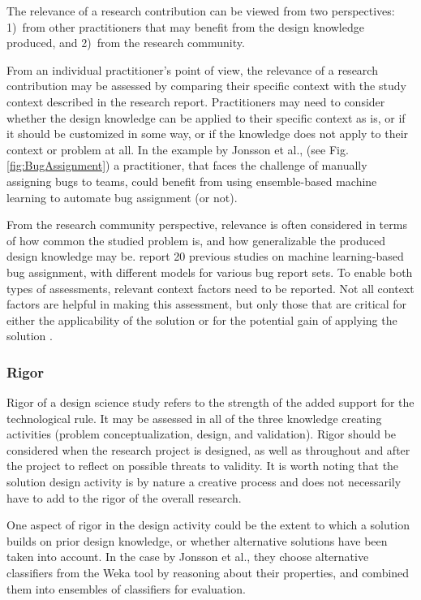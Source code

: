 \documentclass[graybox]{svmult}
\newcommand{\peggy}[1]{\textcolor{blue}{{\it [Peggy says: #1]}}}
\newcommand{\peggy}[1]{}
\begin{document}
The relevance of a research contribution can be viewed from two perspectives: 1)~from other practitioners that may benefit from the design knowledge produced, and 2)~from the research community. 

From an individual practitioner's point of view, the relevance of a research contribution may be assessed by comparing their specific context with the study context described in the research report. 
Practitioners may need to consider whether the design knowledge can be applied to their specific context as is, or if it should be customized in some way, or if the knowledge does not apply to their context or problem at all.
In the example by Jonsson et al., (see Fig.\ref{fig:BugAssignment}) a practitioner, that faces the challenge of manually assigning bugs to teams, could benefit from using ensemble-based machine learning to automate bug assignment (or not). 

From the research community perspective, relevance is often considered in terms of how common the studied problem is, and how generalizable the produced design knowledge may be. \cite{JonssonBug15} report 20 previous studies on machine learning-based bug assignment, with different models for various bug report sets. To enable both types of assessments, relevant context factors need to be reported. Not all context factors are helpful in making this assessment, but only those that are critical for either the applicability of the solution or for the potential gain of applying the solution \citep{Petersen2009}. 


\subsubsection{Rigor} 
Rigor of a design science study refers to the strength of the added support for the technological rule. It may be assessed in all of the three knowledge creating activities (problem conceptualization, design, and validation). 
Rigor should be considered when the research project is designed, as well as throughout and after the project to reflect on possible threats to validity. 
It is worth noting that the solution design activity is by nature a creative process and does not necessarily have to add to the rigor of the overall research. 

One aspect of rigor in the design activity could be the extent to which a solution builds on prior design knowledge, or whether alternative solutions have been taken into account. 
In the case by Jonsson et al., they choose alternative classifiers from the Weka tool by reasoning about their properties, and combined them into ensembles of classifiers for evaluation.
\end{document}
